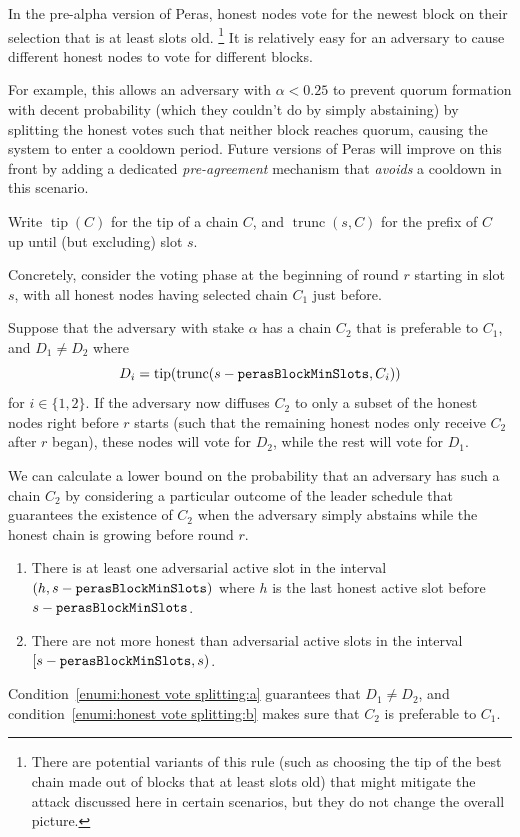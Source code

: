 In the pre-alpha version of Peras, honest nodes vote for the newest block on their selection that is at least \perasBlockMinSlots{} slots old.%
\footnote{There are potential variants of this rule (such as choosing the tip of the best chain made out of blocks that at least \perasBlockMinSlots{} slots old) that might mitigate the attack discussed here in certain scenarios, but they do not change the overall picture.}
It is relatively easy for an adversary to cause different honest nodes to vote for different blocks.

For example, this allows an adversary with $\alpha<0.25$ to prevent quorum formation with decent probability (which they couldn't do by simply abstaining) by splitting the honest votes such that neither block reaches quorum, causing the system to enter a cooldown period.
Future versions of Peras will improve on this front by adding a dedicated \emph{pre-agreement} mechanism that \emph{avoids} a cooldown in this scenario.

Write $\operatorname{tip}(C)$ for the tip of a chain $C$, and $\operatorname{trunc}(s,C)$ for the prefix of $C$ up until (but excluding) slot $s$.

Concretely, consider the voting phase at the beginning of round $r$ starting in slot $s$, with all honest nodes having selected chain $C_1$ just before.

Suppose that the adversary with stake $\alpha$ has a chain $C_2$ that is preferable to $C_1$, and $D_1 \neq D_2$ where \[D_i = \operatorname{tip}(\operatorname{trunc}(s-\mathtt{perasBlockMinSlots},C_i))\] for $i\in\{1,2\}$.
If the adversary now diffuses $C_2$ to only a subset of the honest nodes right before $r$ starts (such that the remaining honest nodes only receive $C_2$ after $r$ began), these nodes will vote for $D_2$, while the rest will vote for $D_1$.

We can calculate a lower bound on the probability that an adversary has such a chain $C_2$ by considering a particular outcome of the leader schedule that guarantees the existence of $C_2$ when the adversary simply abstains while the honest chain is growing before round $r$.

\begin{enumerate}
\item\label{enumi:honest vote splitting:a}
  There is at least one adversarial active slot in the interval $(h,s-\mathtt{perasBlockMinSlots})$ where $h$ is the last honest active slot before $s-\mathtt{perasBlockMinSlots}$.
\item\label{enumi:honest vote splitting:b}
  There are not more honest than adversarial active slots in the interval $[s-\mathtt{perasBlockMinSlots}, s)$.
\end{enumerate}
Condition~\ref{enumi:honest vote splitting:a} guarantees that $D_1\neq D_2$, and condition~\ref{enumi:honest vote splitting:b} makes sure that $C_2$ is preferable to $C_1$.

